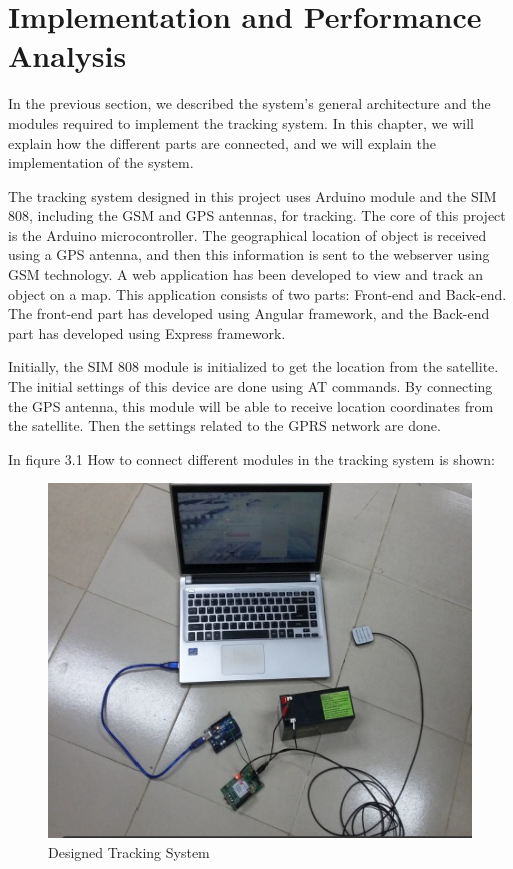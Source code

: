 \chapter{Implementation and Performance Analysis}
In the previous section, we described the system's general architecture and the modules required to implement the tracking system. In this chapter, we will explain how the different parts are connected, and we will explain the implementation of the system.

The tracking system designed in this project uses Arduino module and the ُSIM 808, including the GSM and GPS antennas, for tracking. The core of this project is the Arduino microcontroller. The geographical location of object is received using a GPS antenna, and then this information is sent to the webserver using GSM technology. A web application has been developed to view and track an object on a map. This application consists of two parts: Front-end and Back-end. The front-end part has developed using Angular framework, and the Back-end part has developed using Express framework.

Initially, the SIM 808 module is initialized to get the location from the satellite. The initial settings of this device are done using AT commands. By connecting the GPS antenna, this module will be able to receive location coordinates from the satellite. Then the settings related to the GPRS network are done.

In fiqure 3.1 How to connect different modules in the tracking system is shown:\\
\begin{figure}[!h]
	\centerline{\includegraphics[width=.7\textwidth]{design-system}}
	\caption{Designed Tracking System}
\end{figure}\\
